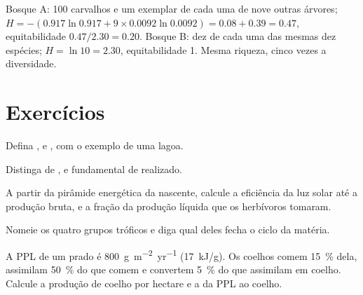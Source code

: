 \begin{example}\label{ex:b1:ecosystem-organization:twowoods}
Bosque A: 100 carvalhos e um exemplar de cada uma de nove outras
árvores; $H = -(0.917\ln
0.917 + 9\times 0.0092\ln 0.0092) = 0.08 + 0.39 = 0.47$,
equitabilidade $0.47/2.30 = 0.20$. Bosque B: dez de cada uma das
mesmas dez espécies; $H =
\ln 10 = 2.30$, equitabilidade 1. Mesma riqueza, cinco vezes a
diversidade.
\end{example}

\section{Exercícios}

\begin{exercise}[$\star$]\label{exo:b1:ecosystem-organization:1}
Defina ,  e , com o exemplo de uma lagoa.
\end{exercise}

\begin{exercise}[$\star$]\label{exo:b1:ecosystem-organization:2}
Distinga  de , e  fundamental de  realizado.
\end{exercise}

\begin{exercise}[$\star$]\label{exo:b1:ecosystem-organization:3}
A partir da pirâmide energética da nascente, calcule a eficiência da
luz solar até a produção bruta, e a fração da produção líquida que os
herbívoros tomaram.
\end{exercise}

\begin{exercise}[$\star$]\label{exo:b1:ecosystem-organization:4}
Nomeie os quatro grupos tróficos e diga qual deles fecha o ciclo da
matéria.
\end{exercise}

\begin{exercise}[$\star\star$]\label{exo:b1:ecosystem-organization:5}
A PPL de um prado é \qty{800}{g.m^{-2}.yr^{-1}} (\qty{17}{kJ/g}). Os
coelhos comem \qty{15}{\%} dela, assimilam \qty{50}{\%} do que comem e
convertem \qty{5}{\%} do que assimilam em coelho. Calcule a produção
de coelho por hectare e a  da PPL ao coelho.
\end{exercise}

